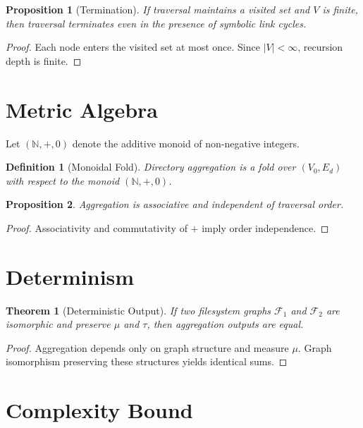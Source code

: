\documentclass[11pt]{article}
\newtheorem{definition}{Definition}
\newtheorem{proposition}{Proposition}
\newtheorem{theorem}{Theorem}
\begin{document}
\begin{proposition}[Termination]
If traversal maintains a visited set and $V$ is finite, then traversal terminates even in the presence of symbolic link cycles.
\end{proposition}

\begin{proof}
Each node enters the visited set at most once.
Since $|V|<\infty$, recursion depth is finite.
\end{proof}

\section{Metric Algebra}

Let $(\mathbb{N}, +, 0)$ denote the additive monoid of non-negative integers.

\begin{definition}[Monoidal Fold]
Directory aggregation is a fold over $(V_0,E_d)$ with respect to the monoid $(\mathbb{N}, +, 0)$.
\end{definition}

\begin{proposition}
Aggregation is associative and independent of traversal order.
\end{proposition}

\begin{proof}
Associativity and commutativity of $+$ imply order independence.
\end{proof}

\section{Determinism}

\begin{theorem}[Deterministic Output]
If two filesystem graphs $\mathcal{F}_1$ and $\mathcal{F}_2$ are isomorphic
and preserve $\mu$ and $\tau$, then aggregation outputs are equal.
\end{theorem}

\begin{proof}
Aggregation depends only on graph structure and measure $\mu$.
Graph isomorphism preserving these structures yields identical sums.
\end{proof}

\section{Complexity Bound}
\end{document}
